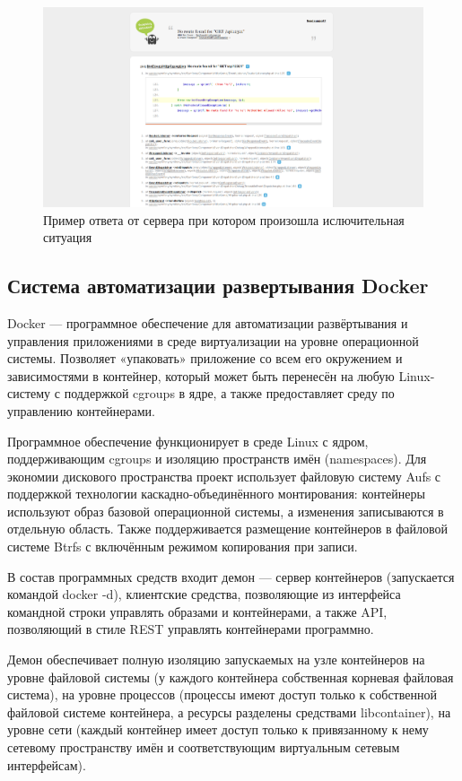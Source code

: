 \begin{figure}[hb]
\centering
  \includegraphics[scale=0.2]{images/symfony_exception.png}  
  \caption{  Пример ответа от сервера при котором произошла ислючительная ситуация }
  \label{fig:domain:symfony_request_workflow}
\end{figure}

\subsection{Система автоматизации развертывания Docker}
Docker — программное обеспечение для автоматизации развёртывания и управления приложениями в среде виртуализации на уровне операционной системы. Позволяет «упаковать» приложение со всем его окружением и зависимостями в контейнер, который может быть перенесён на любую Linux-систему с поддержкой cgroups в ядре, а также предоставляет среду по управлению контейнерами. 

Программное обеспечение функционирует в среде Linux с ядром, поддерживающим cgroups и изоляцию пространств имён (namespaces). Для экономии дискового пространства проект использует файловую систему Aufs с поддержкой технологии каскадно-объединённого монтирования: контейнеры используют образ базовой операционной системы, а изменения записываются в отдельную область. Также поддерживается размещение контейнеров в файловой системе Btrfs с включённым режимом копирования при записи.

В состав программных средств входит демон — сервер контейнеров (запускается командой docker -d), клиентские средства, позволяющие из интерфейса командной строки управлять образами и контейнерами, а также API, позволяющий в стиле REST управлять контейнерами программно.

Демон обеспечивает полную изоляцию запускаемых на узле контейнеров на уровне файловой системы (у каждого контейнера собственная корневая файловая система), на уровне процессов (процессы имеют доступ только к собственной файловой системе контейнера, а ресурсы разделены средствами libcontainer), на уровне сети (каждый контейнер имеет доступ только к привязанному к нему сетевому пространству имён и соответствующим виртуальным сетевым интерфейсам).

